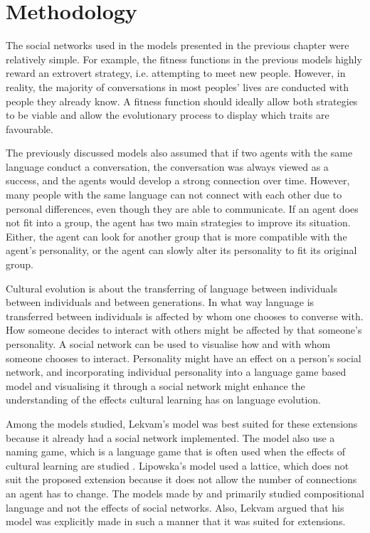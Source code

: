 \acresetall
\chapter{Methodology}\label{ch:Methodology}

The social networks used in the models presented in the previous chapter were relatively simple. For example, the fitness functions in the previous models highly reward an extrovert strategy, i.e. attempting to meet new people. However, in reality, the majority of conversations in most peoples' lives are conducted with people they already know. A fitness function should ideally allow both strategies to be viable and allow the evolutionary process to display which traits are favourable.

The previously discussed models also assumed that if two agents with the same language conduct a conversation, the conversation was always viewed as a success, and the agents would develop a strong connection over time. However, many people with the same language can not connect with each other due to personal differences, even though they are able to communicate. If an agent does not fit into a group, the agent has two main strategies to improve its situation. Either, the agent can look for another group that is more compatible with the agent's personality, or the agent can slowly alter its personality to fit its original group. 

Cultural evolution is about the transferring of language between individuals between individuals and between generations. In what way language is transferred between individuals is affected by whom one chooses to converse with. How someone decides to interact with others might be affected by that someone’s personality. A social network can be used to visualise how and with whom someone chooses to interact. Personality might have an effect on a person’s social network, and incorporating individual personality into a language game based model and visualising it through a social network might enhance the understanding of the effects cultural learning has on language evolution. 

Among the models studied, Lekvam’s model was best suited for these extensions because it already had a social network implemented. The model also use a naming game, which is a language game that is often used when the effects of cultural learning are studied \citep{lekvam2014co, lipowska2011naming, steels2011modeling}. Lipowska’s model used a lattice, which does not suit the proposed extension because it does not allow the number of connections an agent has to change. The models made by \citeauthor{gong2011simulating} and \citeauthor{munroe2002learning} primarily studied compositional language and not the effects of social networks. Also, Lekvam argued that his model was explicitly made in such a manner that it was suited for extensions.

